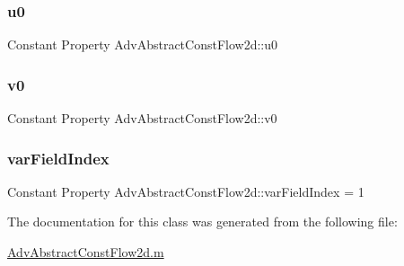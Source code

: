 \subsubsection{\texorpdfstring{u0}{u0}}
{\footnotesize\ttfamily Constant Property Adv\+Abstract\+Const\+Flow2d\+::u0}

\mbox{\label{class_adv_abstract_const_flow2d_a26ac547ef6cd8a164bc5bfa4a5f9e1e3}} 
\subsubsection{\texorpdfstring{v0}{v0}}
{\footnotesize\ttfamily Constant Property Adv\+Abstract\+Const\+Flow2d\+::v0}

\mbox{\label{class_adv_abstract_const_flow2d_a5feb8ff323774cb946fc0de2b38e52c3}} 
\subsubsection{\texorpdfstring{var\+Field\+Index}{varFieldIndex}}
{\footnotesize\ttfamily Constant Property Adv\+Abstract\+Const\+Flow2d\+::var\+Field\+Index = 1}



The documentation for this class was generated from the following file\+:\begin{DoxyCompactItemize}
\item 
\hyperlink{_adv_abstract_const_flow2d_8m}{Adv\+Abstract\+Const\+Flow2d.\+m}\end{DoxyCompactItemize}
